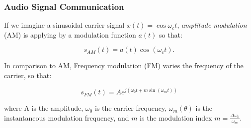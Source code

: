 \subsubsection*{Audio Signal Communication}

If we imagine a sinusoidal carrier signal $x(t) = \cos \omega_c t$, \emph{amplitude modulation} (AM) is applying by a modulation function $a(t)$ so that:


\begin{equation*}
    s_{AM}(t) = a(t) \cos \left( \omega_{c} t\right).    
\end{equation*}

In comparison to AM, Frequency modulation (FM) varies the frequency of the carrier, so that:

\begin{equation*}
    s_{FM}(t) = A e^{j\left(\omega_{0} t + m \sin \left(\omega_ { m } t \right)\right)}
\end{equation*}

where A is the amplitude, $\omega_0$ is the carrier frequency, $\omega_m(\theta)$ is the instantaneous modulation frequency, and $m$ is the modulation index $m = \frac{\Delta \omega_0} { \omega_{m} }$.

